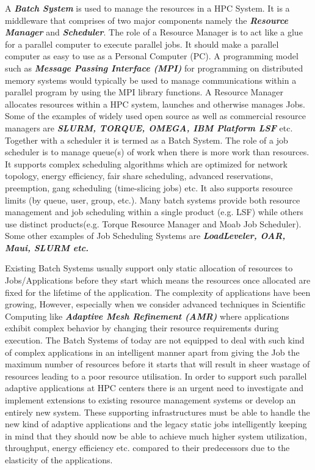 \noindent
A \textbf{\textit{Batch System}} is used to manage the resources in a HPC System. It is a middleware that comprises of two major components namely the \textbf{\textit{Resource Manager}} and \textbf{\textit{Scheduler}}. The role of a Resource Manager is to act like a glue for a parallel computer to execute parallel jobs. It should make a parallel computer as easy to use as a Personal Computer (PC). A programming model such as \textbf{\textit{Message Passing Interface (MPI)}} for programming on distributed memory systems would typically be used to manage communications within a parallel program by using the MPI library functions. A Resource Manager allocates resources within a HPC system, launches and otherwise manages Jobs. Some of the examples of widely used open source as well as commercial resource managers are \textbf{\textit{SLURM, TORQUE, OMEGA, IBM Platform LSF}} etc. Together with a scheduler it is termed as a Batch System. The role of a job scheduler is to manage queue(s) of work when there is more work than resources. It supports complex scheduling algorithms which are optimized for network topology, energy efficiency, fair share scheduling, advanced reservations, preemption, gang scheduling (time-slicing jobs) etc. It also supports resource limits (by queue, user, group, etc.). Many batch systems provide both resource management and job scheduling within a single product (e.g. LSF) while others use distinct products(e.g. Torque Resource Manager and Moab Job Scheduler). Some other examples of Job Scheduling Systems are \textbf{\textit{LoadLeveler, OAR, Maui, SLURM etc.}}\\ \par
\noindent
Existing Batch Systems usually support only static allocation of resources to Jobs/Applications before they start which means the resources once allocated are fixed for the lifetime of the application. The complexity of applications have been growing, However, especially when we consider advanced techniques in Scientific Computing like \textbf{\textit{Adaptive Mesh Refinement (AMR)}} where applications exhibit complex behavior by changing their resource requirements during execution. The Batch Systems of today are not equipped to deal with such kind of complex applications in an intelligent manner apart from giving the Job the maximum number of resources before it starts that will result in sheer wastage of resources leading to a poor resource utilisation. In order to support such parallel adaptive applications at HPC centers there is an urgent need to investigate and implement extensions to existing resource management systems or develop an entirely new system. These supporting infrastructures must be able to handle the new kind of adaptive applications and the legacy static jobs intelligently keeping in mind that they should now be able to achieve much higher system utilization, throughput, energy efficiency etc. compared to their predecessors due to the elasticity of the applications.

